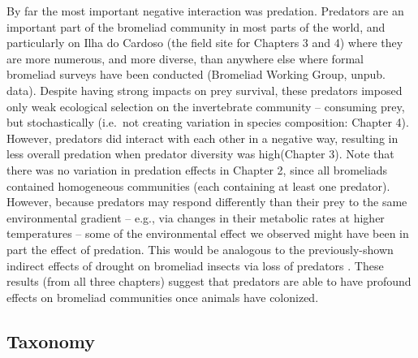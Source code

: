 By far the most important negative interaction was predation. Predators
are an important part of the bromeliad community in most parts of the
world, and particularly on Ilha do Cardoso (the field site for Chapters
3 and 4) where they are more numerous, and more diverse, than anywhere else
where formal bromeliad surveys have been conducted (Bromeliad Working
Group, unpub. data). Despite having strong impacts on prey survival,
these predators imposed only weak ecological selection on the
invertebrate community -- consuming prey, but stochastically (i.e.~not
creating variation in species composition: Chapter 4). However,
predators did interact with each other in a negative way, resulting in
less overall predation when predator diversity was high(Chapter 3). Note
that there was no variation in predation effects in Chapter 2, since all
bromeliads contained homogeneous communities (each containing at least
one predator). However, because predators may respond differently than
their prey to the same environmental gradient -- e.g., via changes in
their metabolic rates at higher temperatures -- some of the
environmental effect we observed might have been in part the effect of
predation. This would be analogous to the previously-shown indirect
effects of drought on bromeliad insects via loss of predators
\citep{Amundrud2015}. These results (from all three chapters) suggest that
predators are able to have profound effects on bromeliad communities
once animals have colonized.

\subsection{Taxonomy}\label{taxonomy}

